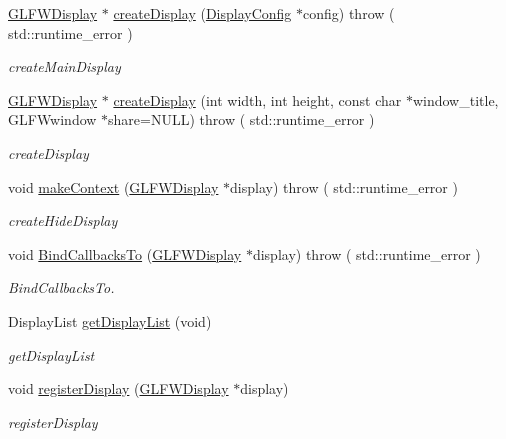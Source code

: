 \begin{DoxyCompactItemize}
\item 
\hyperlink{classEngine_1_1GLFWDisplay}{G\+L\+F\+W\+Display} $\ast$ \hyperlink{classEngine_1_1DisplayManager_ad305871cfad4010eac228d98336b4ebb}{create\+Display} (\hyperlink{classEngine_1_1DisplayConfig}{Display\+Config} $\ast$config)  throw ( std\+::runtime\+\_\+error )
\begin{DoxyCompactList}\small\item\em create\+Main\+Display \end{DoxyCompactList}\item 
\hyperlink{classEngine_1_1GLFWDisplay}{G\+L\+F\+W\+Display} $\ast$ \hyperlink{classEngine_1_1DisplayManager_a6e376561f7f70b69c5a31be76757f1ce}{create\+Display} (int width, int height, const char $\ast$window\+\_\+title, G\+L\+F\+Wwindow $\ast$share=N\+U\+L\+L)  throw ( std\+::runtime\+\_\+error )
\begin{DoxyCompactList}\small\item\em create\+Display \end{DoxyCompactList}\item 
void \hyperlink{classEngine_1_1DisplayManager_a1d91f6a00075812c852358d57670652a}{make\+Context} (\hyperlink{classEngine_1_1GLFWDisplay}{G\+L\+F\+W\+Display} $\ast$display)  throw ( std\+::runtime\+\_\+error )
\begin{DoxyCompactList}\small\item\em create\+Hide\+Display \end{DoxyCompactList}\item 
void \hyperlink{classEngine_1_1DisplayManager_ae8368c3ef80d8e19f793f2b7fecfe187}{Bind\+Callbacks\+To} (\hyperlink{classEngine_1_1GLFWDisplay}{G\+L\+F\+W\+Display} $\ast$display)  throw ( std\+::runtime\+\_\+error )
\begin{DoxyCompactList}\small\item\em Bind\+Callbacks\+To. \end{DoxyCompactList}\item 
Display\+List \hyperlink{classEngine_1_1DisplayManager_ae808617945e1a4245e7c8c12188f7f04}{get\+Display\+List} (void)
\begin{DoxyCompactList}\small\item\em get\+Display\+List \end{DoxyCompactList}\item 
void \hyperlink{classEngine_1_1DisplayManager_ad0315041a819d4866e55e2948980b925}{register\+Display} (\hyperlink{classEngine_1_1GLFWDisplay}{G\+L\+F\+W\+Display} $\ast$display)
\begin{DoxyCompactList}\small\item\em register\+Display \end{DoxyCompactList}\item 

\end{DoxyCompactItemize}
